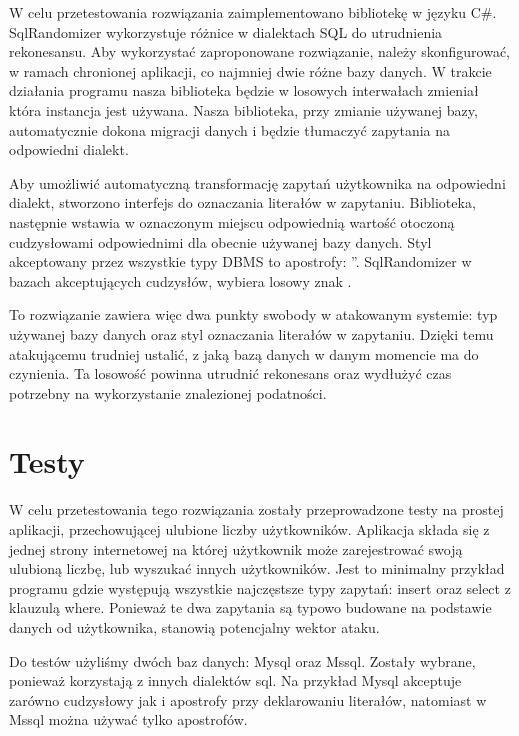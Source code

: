 \documentclass[conference]{IEEEtran}
\begin{document}
W celu przetestowania rozwiązania zaimplementowano bibliotekę w języku C\#.
SqlRandomizer wykorzystuje różnice w dialektach SQL do utrudnienia rekonesansu.
Aby wykorzystać zaproponowane rozwiązanie, należy skonfigurować, w ramach chronionej aplikacji, co najmniej dwie różne bazy danych.
W trakcie działania programu nasza biblioteka będzie w losowych interwałach zmieniał która instancja jest używana.
Nasza biblioteka, przy zmianie używanej bazy, automatycznie dokona migracji danych i będzie tłumaczyć zapytania na odpowiedni dialekt.

Aby umożliwić automatyczną transformację zapytań użytkownika na odpowiedni dialekt, stworzono interfejs do oznaczania literałów w zapytaniu.
Biblioteka, następnie wstawia w oznaczonym miejscu odpowiednią wartość otoczoną cudzysłowami odpowiednimi dla obecnie używanej bazy danych.
Styl akceptowany przez wszystkie typy DBMS to apostrofy: ''.
SqlRandomizer w bazach akceptujących cudzysłów, wybiera losowy znak \cite{mtd:sql}.

To rozwiązanie zawiera więc dwa punkty swobody w atakowanym systemie: typ używanej bazy danych oraz styl oznaczania literałów w zapytaniu.
Dzięki temu atakującemu trudniej ustalić, z jaką bazą danych w danym momencie ma do czynienia.
Ta losowość powinna utrudnić rekonesans oraz wydłużyć czas potrzebny na wykorzystanie znalezionej podatności.



\section{Testy}
W celu przetestowania tego rozwiązania zostały przeprowadzone testy na prostej aplikacji, przechowującej ulubione liczby użytkowników.
Aplikacja składa się z jednej strony internetowej na której użytkownik może zarejestrować swoją ulubioną liczbę, lub wyszukać innych użytkowników.
Jest to minimalny przykład programu gdzie występują wszystkie najczęstsze typy zapytań: insert oraz select z klauzulą where.
Ponieważ te dwa zapytania są typowo budowane na podstawie danych od użytkownika, stanowią potencjalny wektor ataku.

Do testów użyliśmy dwóch baz danych: Mysql oraz Mssql.
Zostały wybrane, ponieważ korzystają z innych dialektów sql.
Na przykład Mysql akceptuje zarówno cudzysłowy jak i apostrofy przy deklarowaniu literałów, natomiast w Mssql można używać tylko apostrofów.
\end{document}
